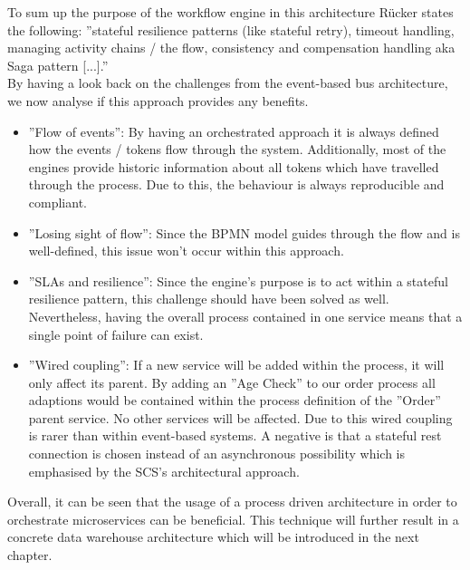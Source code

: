 To sum up the purpose of the workflow engine in this architecture Rücker states the following: ''stateful resilience patterns (like stateful retry), timeout handling, managing activity chains / the flow, consistency and compensation handling aka Saga pattern [...].'' \cite{orchestrationMicroServices}\newline
\\
By having a look back on the challenges from the event-based bus architecture, we now analyse if this approach provides any benefits. 
\begin{itemize}
    \item ''Flow of events'': By having an orchestrated approach it is always defined how the events / tokens flow through the system. Additionally, most of the engines provide historic information about all tokens which have travelled through the process. Due to this, the behaviour is always reproducible and compliant. 
    \item ''Losing sight of flow'': Since the BPMN model guides through the flow and is well-defined, this issue won't occur within this approach.
    \item ''SLAs and resilience'': Since the engine's purpose is to act within a stateful resilience pattern, this challenge should have been solved as well. Nevertheless, having the overall process contained in one service means that a single point of failure can exist. 
    \item ''Wired coupling'': If a new service will be added within the process, it will only affect its parent. By adding an ''Age Check'' to our order process all adaptions would be contained within the process definition of the ''Order'' parent service. No other services will be affected. Due to this wired coupling is rarer than within event-based systems. A negative is that a stateful \acrshort{rest} connection is chosen instead of an asynchronous possibility which is emphasised by the SCS's architectural approach. 
\end{itemize}
Overall, it can be seen that the usage of a process driven architecture in order to orchestrate microservices can be beneficial. This technique will further result in a concrete data warehouse architecture which will be introduced in the next chapter. 
